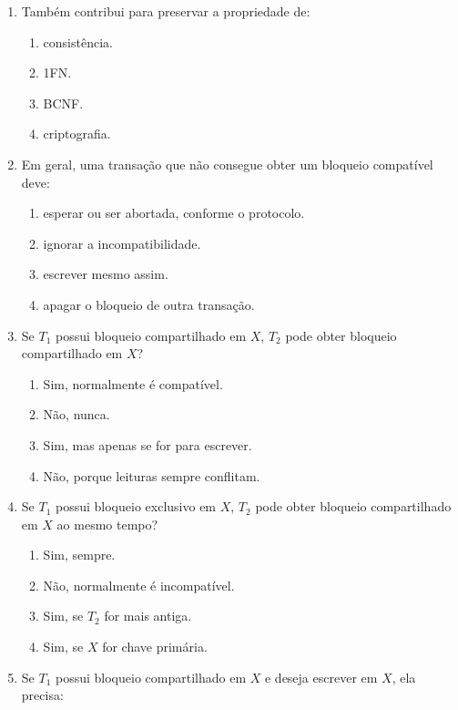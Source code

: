 \documentclass[12pt,a4paper]{article}
\begin{document}
\begin{enumerate}[label=\textbf{Q\arabic*.}]
\item Também contribui para preservar a propriedade de:

\begin{enumerate}[label=\alph*)]
    \item consistência.
    \item 1FN.
    \item BCNF.
    \item criptografia.
\end{enumerate}

\item Em geral, uma transação que não consegue obter um bloqueio compatível deve:

\begin{enumerate}[label=\alph*)]
    \item esperar ou ser abortada, conforme o protocolo.
    \item ignorar a incompatibilidade.
    \item escrever mesmo assim.
    \item apagar o bloqueio de outra transação.
\end{enumerate}

\item Se $T_1$ possui bloqueio compartilhado em $X$, $T_2$ pode obter bloqueio compartilhado em $X$?

\begin{enumerate}[label=\alph*)]
    \item Sim, normalmente é compatível.
    \item Não, nunca.
    \item Sim, mas apenas se for para escrever.
    \item Não, porque leituras sempre conflitam.
\end{enumerate}

\item Se $T_1$ possui bloqueio exclusivo em $X$, $T_2$ pode obter bloqueio compartilhado em $X$ ao mesmo tempo?

\begin{enumerate}[label=\alph*)]
    \item Sim, sempre.
    \item Não, normalmente é incompatível.
    \item Sim, se $T_2$ for mais antiga.
    \item Sim, se $X$ for chave primária.
\end{enumerate}

\item Se $T_1$ possui bloqueio compartilhado em $X$ e deseja escrever em $X$, ela precisa:


\end{enumerate}
\end{document}
